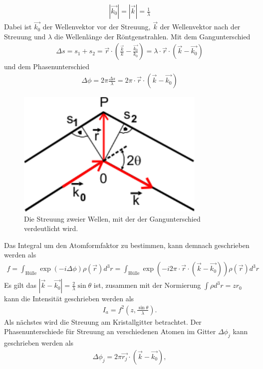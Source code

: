 \begin{align}
	|\vec{k_0}|=|\vec{k}|=\frac{1}{\lambda}
\end{align}
Dabei ist $\vec{k_0}$ der Wellenvektor vor der Streuung, $\vec{k}$ der Wellenvektor nach der Streuung und $\lambda$ die Wellenlänge der Röntgenstrahlen.
Mit dem Gangunterschied
\begin{align}
	\Delta s = s_1 + s_2= \vec{r}\cdot\left( \frac{\vec{k}}{k}-\frac{\vec{k_0}}{k_0}\right)=\lambda\cdot\vec{r}\cdot\left(\vec{k}-\vec{k_0}\right)
\end{align}
und dem Phasenunterschied
\begin{align}
	\Delta \phi = 2\pi \frac{\Delta s}{\lambda}=2\pi\cdot\vec{r}\cdot\left(\vec{k}-\vec{k_0}\right)
\end{align}
\begin{figure}
	\centering
	\includegraphics[scale = 1]{../Grafiken/StreuungUnterschied.pdf}
	\caption{Die Streuung zweier Wellen, mit der der Gangunterschied verdeutlicht wird\cite{V41}.}\label{fig:Gangunterschied}
\end{figure}
Das Integral um den Atomformfaktor zu bestimmen, kann demnach geschrieben werden als
\begin{align}
	f=\int_{\text{Hülle}}\exp(-i\Delta \phi)\rho(\vec{r})d^3r=\int_{\text{Hülle}}\exp(-i2\pi\cdot\vec{r}\cdot\left(\vec{k}-\vec{k_0}\right))\rho(\vec{r})d^3r
\end{align}
Es gilt das $|\vec{k}-\vec{k_0}| =\frac{2}{\lambda}\sin\theta$ ist, zusammen mit der Normierung $\int \rho d^3r = zr_0$ kann die Intensität geschrieben werden als
\begin{align}
	I_a=f^2\left(z, \frac{\sin\theta}{\lambda} \right).
\end{align}
Als nächstes wird die Streuung am Kristallgitter betrachtet. Der Phasenunterschiede für Streuung an verschiedenen Atomen im Gitter $\Delta \phi_j$ kann geschrieben werden als 
\begin{align}
	\Delta \phi_j = 2\pi \vec{r_j}\cdot\left(\vec{k}-\vec{k_0}\right),
\end{align}
